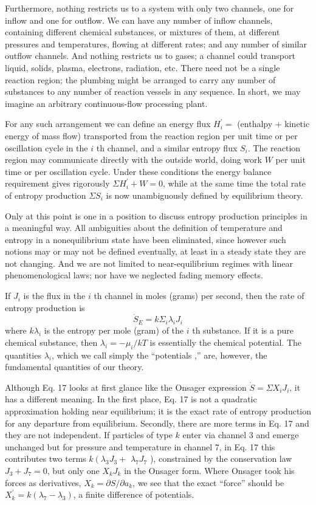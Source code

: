 \documentclass{article}
\begin{document}
Furthermore, nothing restricts us to a system with only two channels, one for inflow and one for outflow. We can have any number of inflow channels, containing different chemical substances, or mixtures of them, at different pressures and temperatures, flowing at different rates; and any number of similar outflow channels. And nothing restricts us to gases; a channel could transport liquid, solids, plasma, electrons, radiation, etc. There need not be a single reaction region; the plumbing might be arranged to carry any number of substances to any number of reaction vessels in any sequence. In short, we may imagine an arbitrary continuous-flow processing plant.

For any such arrangement we can define an energy flux $H_i^{\prime}=$ (enthalpy + kinetic energy of mass flow) transported from the reaction region per unit time or per oscillation cycle in the $i$ th channel, and a similar entropy flux $S_i$. The reaction region may communicate directly with the outside world, doing work $W$ per unit time or per oscillation cycle. Under these conditions the energy balance requirement gives rigorously $\Sigma H_i^{\prime}+W=0$, while at the same time the total rate of entropy production $\Sigma S_i$ is now unambiguously defined by equilibrium theory.

Only at this point is one in a position to discuss entropy production principles in a meaningful way. All ambiguities about the definition of temperature and entropy in a nonequilibrium state have been eliminated, since however such notions may or may not be defined eventually, at least in a steady state they are not changing. And we are not limited to near-equilibrium regimes with linear phenomenological laws; nor have we neglected fading memory effects.

If $J_i$ is the flux in the $i$ th channel in moles (grams) per second, then the rate of entropy production is
$$
\dot{S}_E=k \Sigma_i \lambda_i J_i
$$
where $k \lambda_i$ is the entropy per mole (gram) of the $i$ th substance. If it is a pure chemical substance, then $\lambda_i=-\mu_i / k T$ is essentially the chemical potential. The quantities $\lambda_i$, which we call simply the ``potentials ,'' are, however, the fundamental quantities of our theory.

Although Eq. 17 looks at first glance like the Onsager expression $\dot{S}=\Sigma X_i J_i$, it has a different meaning. In the first place, Eq. 17 is not a quadratic approximation holding near equilibrium; it is the exact rate of entropy production for any departure from equilibrium. Secondly, there are more terms in Eq. 17 and they are not independent. If particles of type $k$ enter via channel 3 and emerge unchanged but for pressure and temperature in channel 7, in Eq. 17 this contributes two terms $k\left(\lambda_3 J_3+\right.$ $\lambda_7 J_7$ ), constrained by the conservation law $J_3+J_7=0$, but only one $X_k J_k$ in the Onsager form. Where Onsager took his forces as derivatives, $X_k=\partial S / \partial a_k$, we see that the exact ``force'' should be $X_k^{\prime}=k\left(\lambda_7-\lambda_3\right)$, a finite difference of potentials.
\end{document}
